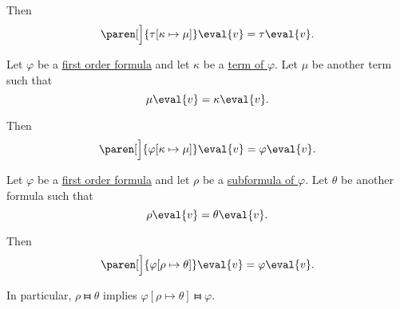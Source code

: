 \begin{proposition}
\begin{propenum}
    Then
    \begin{equation}\label{eq:thm:first_order_substitution_equivalence/term_in_term}
      \paren[\Big]{ \tau[\kappa \mapsto \mu] }\eval{v} = \tau\eval{v}.
    \end{equation}

     Let \( \varphi \) be a \hyperref[def:first_order_syntax/formula]{first order formula} and let \( \kappa \) be a \hyperref[def:first_order_syntax/formula_terms]{term of \( \varphi \)}. Let \( \mu \) be another term such that
    \begin{equation}\label{eq:thm:first_order_substitution_equivalence/term_in_formula/compatibility}
      \mu\eval{v} = \kappa\eval{v}.
    \end{equation}

    Then
    \begin{equation}\label{eq:thm:first_order_substitution_equivalence/term_in_formula}
      \paren[\Big]{ \varphi[\kappa \mapsto \mu] }\eval{v} = \varphi\eval{v}.
    \end{equation}

     Let \( \varphi \) be a \hyperref[def:first_order_syntax/formula]{first order formula} and let \( \rho \) be a \hyperref[def:first_order_syntax/subformula]{subformula of \( \varphi \)}. Let \( \theta \) be another formula such that
    \begin{equation}\label{eq:thm:first_order_substitution_equivalence/formula_in_formula/compatibility}
      \rho\eval{v} = \theta\eval{v}.
    \end{equation}

    Then
    \begin{equation}\label{eq:thm:first_order_substitution_equivalence/formula_in_formula}
      \paren[\Big]{ \varphi[\rho \mapsto \theta] }\eval{v} = \varphi\eval{v}.
    \end{equation}

    In particular, \( \rho \gleichstark \theta \) implies \( \varphi[\rho \mapsto \theta] \gleichstark \varphi \).
  \end{propenum}
\end{proposition}
